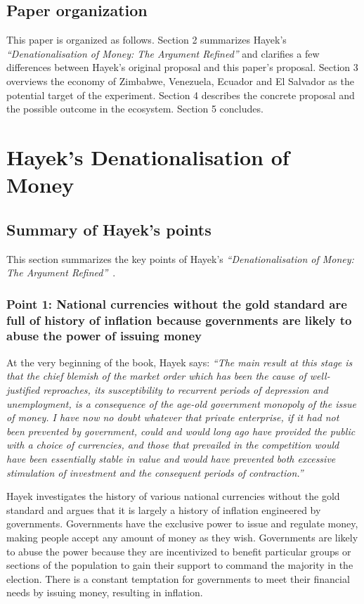 \documentclass[dvipdfmx,a4paper]{article}
\begin{document}
\subsection{Paper organization}

This paper is organized as follows. Section 2 summarizes Hayek's \textit{``Denationalisation of Money: The Argument Refined''} and clarifies a few differences between Hayek's original proposal and this paper's proposal. Section 3 overviews the economy of Zimbabwe, Venezuela, Ecuador and El Salvador as the potential target of the experiment. Section 4 describes the concrete proposal and the possible outcome in the ecosystem. Section 5 concludes.

\section{Hayek's Denationalisation of Money}

\subsection{Summary of Hayek's points}

This section summarizes the key points of Hayek's \textit{``Denationalisation of Money: The Argument Refined''}~\cite{hayekbook}.

\subsubsection{Point 1: National currencies without the gold standard are full of history of inflation because governments are likely to abuse the power of issuing money}

At the very beginning of the book, Hayek says: \textit{``The main result at this stage is that the chief blemish of the market order which has been the cause of well-justified reproaches, its susceptibility to recurrent periods of depression and unemployment, is a consequence of the age-old government monopoly of the issue of money. I have now no doubt whatever that private enterprise, if it had not been prevented by government, could and would long ago have provided the public with a choice of currencies, and those that prevailed in the competition would have been essentially stable in value and would have prevented both excessive stimulation of investment and the consequent periods of contraction.''}

Hayek investigates the history of various national currencies without the gold standard and argues that it is largely a history of inflation engineered by governments. Governments have the exclusive power to issue and regulate money, making people accept any amount of money as they wish. Governments are likely to abuse the power because they are incentivized to benefit particular groups or sections of the population to gain their support to command the majority in the election. There is a constant temptation for governments to meet their financial needs by issuing money, resulting in inflation.
\end{document}
